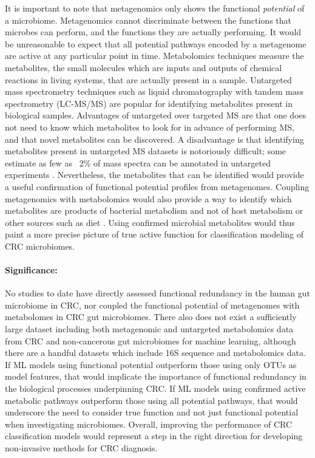 \documentclass[11pt]{article}
\begin{document}
It is important to note that metagenomics only shows the functional \textit{potential} of a microbiome.
Metagenomics cannot discriminate between the functions that microbes can perform, and the functions they are actually performing.
It would be unreasonable to expect that all potential pathways encoded by a metagenome are active at any particular point in time.
Metabolomics techniques measure the metabolites, the small molecules which are inputs and outputs of chemical reactions in living systems, that are actually present in a sample.
Untargeted mass spectrometry techniques such as liquid chromatography with tandem mass spectrometry (LC-MS/MS) are popular for identifying metabolites present in biological samples.
Advantages of untargeted over targeted MS are that one does not need to know which metabolites to look for in advance of performing MS, and that novel metabolites can be discovered.
A disadvantage is that identifying metabolites present in untargeted MS datasets is notoriously difficult; some estimate as few as ~2\% of mass spectra can be annotated in untargeted experiments \cite{da_silva_illuminating_2015}.
Nevertheless, the metabolites that can be identified would provide a useful confirmation of functional potential profiles from metagenomes.
Coupling metagenomics with metabolomics would also provide a way to identify which metabolites are products of bacterial metabolism and not of host metabolism or other sources such as diet \cite{shaffer_amon_2019}.
Using confirmed microbial metabolites would thus paint a more precise picture of true active function for classification modeling of CRC microbiomes.

\paragraph{Significance:} %
No studies to date have directly assessed functional redundancy in the human gut microbiome in CRC,
nor coupled the functional potential of metagenomes with metabolomes in CRC gut microbiomes.
There also does not exist a sufficiently large dataset including both metagenomic and untargeted metabolomics data from CRC and non-cancerous gut microbiomes for machine learning, although there are a handful datasets which include 16S sequence and metabolomics data.
If ML models using functional potential outperform those using only OTUs as model features,
that would implicate the importance of functional redundancy in the biological processes underpinning CRC.
If ML models using confirmed active metabolic pathways outperform those using all potential pathways,
that would underscore the need to consider true function and not just functional potential when investigating microbiomes.
Overall, improving the performance of CRC classification models would represent a step in the right direction for developing non-invasive methods for CRC diagnosis.
\end{document}
